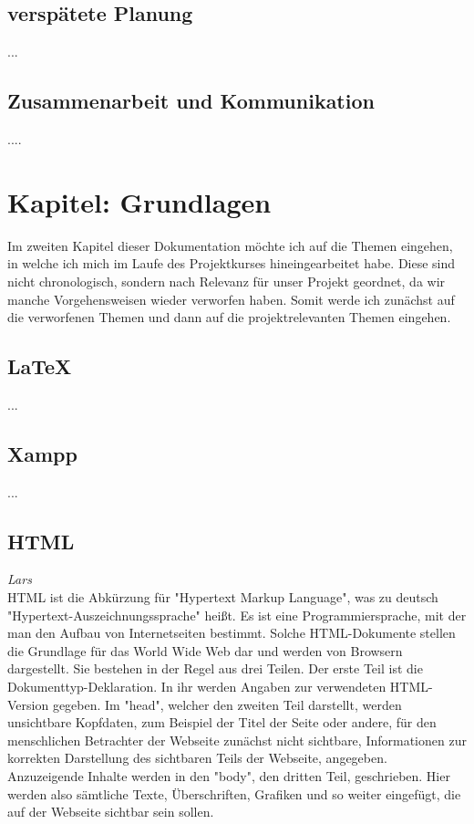 \documentclass[12pt,a4paper,bibliography=totocnumbered,listof=totocnumbered]{scrartcl}
\begin{document}
\subsection{verspätete Planung}
...
\subsection{Zusammenarbeit und Kommunikation}
....

\section{Kapitel: Grundlagen}
Im zweiten Kapitel dieser Dokumentation möchte ich auf die Themen eingehen, in welche ich mich im Laufe des Projektkurses hineingearbeitet habe.
Diese sind nicht chronologisch, sondern nach Relevanz für unser Projekt geordnet, da wir manche Vorgehensweisen wieder verworfen haben.
Somit werde ich zunächst auf die verworfenen Themen und dann auf die projektrelevanten Themen eingehen.

\subsection{\LaTeX{}}
...

\subsection{Xampp}
...

\subsection{HTML}
\emph{Lars}\\
HTML ist die Abkürzung für "Hypertext Markup Language", was zu deutsch "Hypertext-Auszeichnungssprache" heißt. Es ist eine Programmiersprache, mit der man den Aufbau von Internetseiten bestimmt. Solche HTML-Dokumente stellen die Grundlage für das World Wide Web dar und werden von Browsern dargestellt. Sie bestehen in der Regel aus drei Teilen. Der erste Teil ist die Dokumenttyp-Deklaration. In ihr werden Angaben zur verwendeten HTML-Version gegeben. Im "head", welcher den zweiten Teil darstellt, werden unsichtbare Kopfdaten, zum Beispiel der Titel der Seite oder andere, für den menschlichen Betrachter der Webseite zunächst nicht sichtbare, Informationen zur korrekten Darstellung des sichtbaren Teils der Webseite, angegeben. Anzuzeigende Inhalte werden in den "body", den dritten Teil, geschrieben. Hier werden also sämtliche Texte, Überschriften, Grafiken und so weiter eingefügt, die auf der Webseite sichtbar sein sollen.
\end{document}
